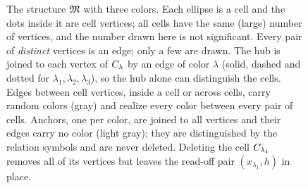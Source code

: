 \begin{figure}[t]
\caption{The structure $\mathfrak M$ with three colors. Each ellipse is a cell and
the dots inside it are cell vertices; all cells have the same (large) number
of vertices, and the number drawn here is not significant. Every pair of
\emph{distinct} vertices is an edge; only a few are drawn. The hub is joined
to each vertex of $C_{\lambda}$ by an edge of color $\lambda$ (solid,
dashed and dotted for $\lambda_1,\lambda_2,\lambda_3$), so the hub alone can
distinguish the cells. Edges between cell vertices, inside a cell or across
cells, carry random colors (gray) and realize every color between every
pair of cells. Anchors, one per color, are joined to all vertices and their
edges carry no color (light gray); they are distinguished by the relation
symbols and are never deleted. Deleting the cell $C_{\lambda_1}$ removes
all of its vertices but leaves the read-off pair $(x_{\lambda_1},h)$ in
place.}
\label{fig:structure}
\end{figure}

